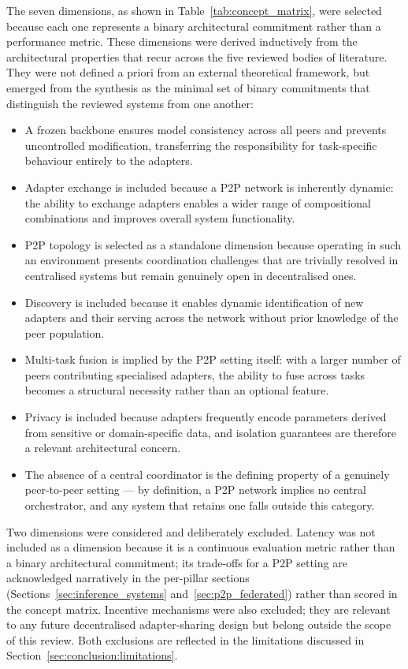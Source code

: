 The seven dimensions, as shown in Table~\ref{tab:concept_matrix}, were selected because each one represents a binary architectural commitment rather than a performance metric. These dimensions were derived inductively from the architectural properties that recur across the five reviewed bodies of literature. They were not defined a priori from an external theoretical framework, but emerged from the synthesis as the minimal set of binary commitments that distinguish the reviewed systems from one another:
\begin{itemize}
    \item A frozen backbone ensures model consistency across all peers and prevents uncontrolled modification, transferring the responsibility for task-specific behaviour entirely to the adapters. 
    \item Adapter exchange is included because a P2P network is inherently dynamic: the ability to exchange adapters enables a wider range of compositional combinations and improves overall system functionality.
    \item P2P topology is selected as a standalone dimension because operating in such an environment presents coordination challenges that are trivially resolved in centralised systems but remain genuinely open in decentralised ones.
    \item  Discovery is included because it enables dynamic identification of new adapters and their serving across the network without prior knowledge of the peer population. 
    \item Multi-task fusion is implied by the P2P setting itself: with a larger number of peers contributing specialised adapters, the ability to fuse across tasks becomes a structural necessity rather than an optional feature.
    \item Privacy is included because adapters frequently encode parameters derived from sensitive or domain-specific data, and isolation guarantees are therefore a relevant architectural concern. 
    \item The absence of a central coordinator is the defining property of a genuinely peer-to-peer setting --- by definition, a P2P network implies no central orchestrator, and any system that retains one falls outside this category.
\end{itemize}

Two dimensions were considered and deliberately excluded. Latency was not included as a dimension because it is a continuous evaluation metric rather than a binary architectural commitment; its trade-offs for a P2P setting are acknowledged narratively in the per-pillar sections (Sections~\ref{sec:inference_systems} and~\ref{sec:p2p_federated}) rather than scored in the concept matrix. Incentive mechanisms were also excluded; they are relevant to any future decentralised adapter-sharing design but belong outside the scope of this review. Both exclusions are reflected in the limitations discussed in Section~\ref{sec:conclusion:limitations}.

